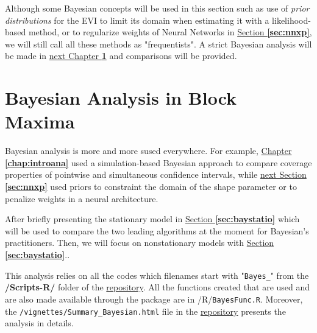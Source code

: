 \documentclass[11pt,a4paper,openany, twosided]{book}
\begin{document}
Although some Bayesian concepts will be used in this section such as use of \emph{prior distributions} for the EVI to limit its domain when estimating it with a likelihood-based method, or to regularize weights of Neural Networks in \hyperref[sec:nnxp]{Section \textbf{\ref{sec:nnxp}}}, we will still call all these methods as "frequentists".
A strict Bayesian analysis will be made in \hyperref[sec:anabayes]{next Chapter \textbf{\ref{sec:anabayes}}} and comparisons will be provided.

\newpage

\chapter{Bayesian Analysis in Block Maxima}\label{sec:anabayes}
\minitoc \thispagestyle{empty}
 \vspace{1cm}
 
Bayesian analysis is more and more sused everywhere. For example,  \hyperref[chap:introana]{Chapter \textbf{\ref{chap:introana}}} used a simulation-based Bayesian approach to compare coverage properties of pointwise and simultaneous confidence intervals, while \hyperref[sec:nnxp]{next Section \textbf{\ref{sec:nnxp}}} used priors to constraint the domain of the shape parameter or to penalize weights in a neural architecture.

After briefly presenting the stationary model in \hyperref[sec:baystatio]{Section \textbf{\ref{sec:baystatio}}} which will be used to compare the two leading algorithms at the moment for Bayesian's practitioners. Then, we will focus on nonstationary models with \hyperref[sec:baystatio]{Section \textbf{\ref{sec:baystatio}}}..

This analysis relies on all the codes which filenames start with "\texttt{Bayes\_}" from the \textbf{/Scripts-R/} folder of the \href{https://github.com/proto4426/PissoortThesis/}{repository}. All the functions created that are used and are also made available through the package are in /R/\texttt{BayesFunc.R}. Moreover,
the \texttt{/vignettes/Summary\_Bayesian.html} file in the \href{https://github.com/proto4426/PissoortThesis/}{repository} presents the analysis in details.
\end{document}
